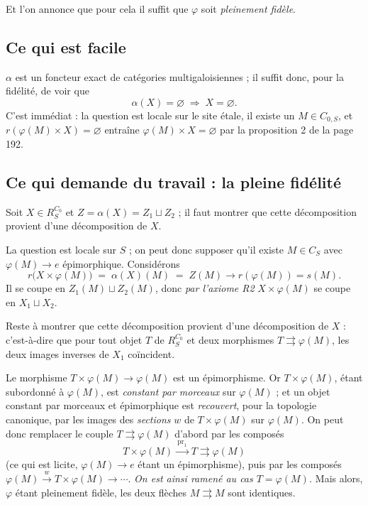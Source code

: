 \documentclass[11pt,a4paper]{article}
\begin{document}
Et l'on annonce que pour cela il suffit que $\varphi$ soit \emph{pleinement
fidèle}.

\subsection*{Ce qui est facile}

$\alpha$ est un foncteur exact de catégories multigaloisiennes ; il suffit donc,
pour la fidélité, de voir que
\[
  \alpha(X) = \varnothing \;\Longrightarrow\; X = \varnothing .
\]
C'est immédiat : la question est locale sur le site étale, il existe un
$M \in C_{0,S}$, et
$r(\varphi(M) \times X) = \varnothing$ entraîne
$\varphi(M) \times X = \varnothing$ par la proposition 2 de la page 192.

\subsection*{Ce qui demande du travail : la pleine fidélité}

Soit $X \in R_{S}^{C_{0}}$ et $Z = \alpha(X) = Z_{1} \sqcup Z_{2}$ ; il faut
montrer que cette décomposition provient d'une décomposition de $X$.

La question est locale sur $S$ ; on peut donc supposer qu'il existe
$M \in C_{S}$ avec $\varphi(M) \to e$ épimorphique. Considérons
\[
  r\bigl(X \times \varphi(M)\bigr) \;=\; \alpha(X)(M) \;=\; Z(M)
  \longrightarrow r(\varphi(M)) = s(M) .
\]
Il se coupe en $Z_{1}(M) \sqcup Z_{2}(M)$, donc \emph{par l'axiome R2}
$X \times \varphi(M)$ se coupe en $X_{1} \sqcup X_{2}$.

Reste à montrer que cette décomposition provient d'une décomposition de $X$ :
c'est-à-dire que pour tout objet $T$ de $R_{S}^{C_{0}}$ et deux morphismes
$T \rightrightarrows \varphi(M)$, les deux images inverses de $X_{1}$
coïncident.


Le morphisme $T \times \varphi(M) \to \varphi(M)$ est un épimorphisme. Or
$T \times \varphi(M)$, étant subordonné à $\varphi(M)$, est \emph{constant par
morceaux} sur $\varphi(M)$ ; et un objet constant par morceaux et épimorphique
est \emph{recouvert}, pour la topologie canonique, par les images des
\emph{sections} $w$ de $T \times \varphi(M)$ sur $\varphi(M)$. On peut donc
remplacer le couple $T \rightrightarrows \varphi(M)$ d'abord par les composés
\[
  T \times \varphi(M) \xrightarrow{\ \mathrm{pr}_{1}\ } T
  \rightrightarrows \varphi(M)
\]
(ce qui est licite, $\varphi(M) \to e$ étant un épimorphisme), puis par
les composés $\varphi(M) \xrightarrow{\ w\ } T \times \varphi(M) \to \cdots$.
\emph{On est ainsi ramené au cas $T = \varphi(M)$.} Mais alors, $\varphi$ étant
pleinement fidèle, les deux flèches $M \rightrightarrows M$ sont identiques.
\end{document}
